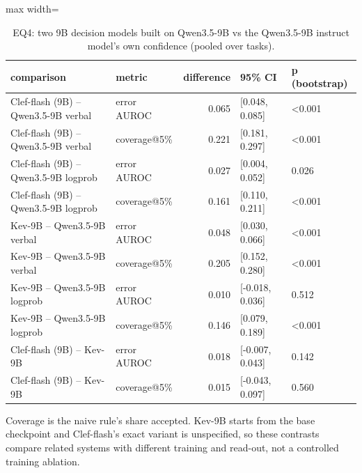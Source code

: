 \begin{table}[t]
\centering
\small
\caption{EQ4: two 9B decision models built on Qwen3.5-9B vs the Qwen3.5-9B instruct model's own confidence (pooled over tasks).}
\label{tab:main_same_base}
\begin{adjustbox}{max width=\linewidth}
\begin{tabular}{llrll}
\toprule
comparison & metric & difference & 95\% CI & p (bootstrap) \\
\midrule
Clef-flash (9B) -- Qwen3.5-9B verbal & error AUROC & 0.065 & [0.048, 0.085] & <0.001 \\
Clef-flash (9B) -- Qwen3.5-9B verbal & coverage@5\% & 0.221 & [0.181, 0.297] & <0.001 \\
Clef-flash (9B) -- Qwen3.5-9B logprob & error AUROC & 0.027 & [0.004, 0.052] & 0.026 \\
Clef-flash (9B) -- Qwen3.5-9B logprob & coverage@5\% & 0.161 & [0.110, 0.211] & <0.001 \\
Kev-9B -- Qwen3.5-9B verbal & error AUROC & 0.048 & [0.030, 0.066] & <0.001 \\
Kev-9B -- Qwen3.5-9B verbal & coverage@5\% & 0.205 & [0.152, 0.280] & <0.001 \\
Kev-9B -- Qwen3.5-9B logprob & error AUROC & 0.010 & [-0.018, 0.036] & 0.512 \\
Kev-9B -- Qwen3.5-9B logprob & coverage@5\% & 0.146 & [0.079, 0.189] & <0.001 \\
Clef-flash (9B) -- Kev-9B & error AUROC & 0.018 & [-0.007, 0.043] & 0.142 \\
Clef-flash (9B) -- Kev-9B & coverage@5\% & 0.015 & [-0.043, 0.097] & 0.560 \\
\bottomrule
\end{tabular}
\end{adjustbox}
\par\smallskip\footnotesize\raggedright Coverage is the naive rule's share accepted. Kev-9B starts from the base checkpoint and Clef-flash's exact variant is unspecified, so these contrasts compare related systems with different training and read-out, not a controlled training ablation.
\end{table}
